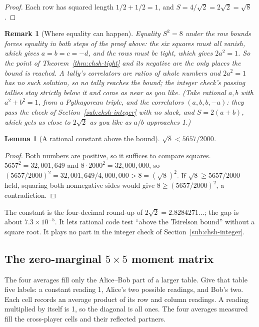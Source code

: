 \documentclass[11pt,twoside]{article}
\theoremstyle{thielethm}
\newtheorem{lemma}[theorem]{Lemma}
\theoremstyle{thieledef}
\theoremstyle{thieledef}
\newtheorem{remark}{Remark}[section]
\theoremstyle{thieledef}
\theoremstyle{thielethm}
\theoremstyle{thieleobs}
\theoremstyle{thielethm}
\begin{document}
\begin{proof}
Each row has squared length $1/2 + 1/2 = 1$, and $S = 4/\sqrt 2 = 2\sqrt 2 = \sqrt 8$.
\end{proof}

\begin{remark}[Where equality can happen]
Equality $S^2 = 8$ under the row bounds forces
equality in both steps of the proof above: the six squares must all vanish, which gives
$a = b = c = -d$, and the rows must be tight, which gives $2a^2 = 1$. So the point of
Theorem~\ref{thm:chsh-tight} and its negative are the only places the bound is reached. A tally's correlators are
ratios of whole numbers and $2a^2 = 1$ has no such solution, so no tally reaches the bound; the integer
check's passing tallies stay strictly below it and come as near as you like. (Take rational
$a, b$ with $a^2 + b^2 = 1$, from a Pythagorean triple, and the correlators $(a, b, b, -a)$: they pass
the check of Section~\ref{sub:chsh-integer} with no slack, and $S = 2(a + b)$, which gets as close to
$2\sqrt 2$ as you like as $a/b$ approaches 1.)
\end{remark}

\begin{lemma}[A rational constant above the bound]\label{lem:chsh-rational}
$\sqrt 8 < 5657/2000$.
\end{lemma}

\begin{proof}
Both numbers are positive, so it suffices to compare squares. $5657^2 = 32{,}001{,}649$ and
$8 \cdot 2000^2 = 32{,}000{,}000$, so $(5657/2000)^2 = 32{,}001{,}649/4{,}000{,}000 > 8 =
(\sqrt 8)^2$. If $\sqrt 8 \ge 5657/2000$ held, squaring both nonnegative sides would give
$8 \ge (5657/2000)^2$, a contradiction.
\end{proof}

The constant is the four-decimal round-up of $2\sqrt 2 = 2.8284271\ldots$; the gap is about
$7.3 \times 10^{-5}$. It lets rational code test ``above the Tsirelson bound'' without a square
root. It plays no part in the integer check of Section~\ref{sub:chsh-integer}.

\subsection{The zero-marginal \texorpdfstring{$5\times5$}{5 by 5} moment matrix}


The four averages fill only the Alice--Bob part of a larger table. Give that
table five labels: a constant reading 1, Alice's two possible readings, and
Bob's two. Each cell records an average product of its row and column
readings. A reading multiplied by itself is 1, so the diagonal is all ones.
The four averages measured fill the cross-player cells and their reflected
partners.
\end{document}

